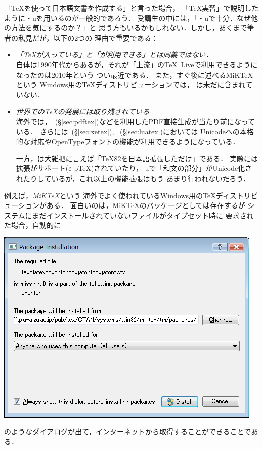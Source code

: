 \documentclass[b5paper]{bxjsarticle} %
\begin{document}
「\TeX を使って日本語文書を作成する」と言った場合，
「\TeX 実習」で説明したように\pTeX ・u\pTeX を用いるのが一般的であろう．
受講生の中には，「\pTeX ・u\pTeX で十分．なぜ他の方法を気にするのか？」と
思う方もいるかもしれない．しかし，あくまで筆者の私見だが，以下の2つの
理由で重要である：
\begin{itemize}
 \item \emph{「\TeX が入っている」と「\pTeX が利用できる」とは同義ではない．}\\
\pTeX 自体は1990年代からあるが，それが「上流」の\TeX~Liveで利用できるようになったのは2010年という
つい最近である．
また，すぐ後に述べるMiK\TeX という
Windows用の\TeX ディストリビューションでは，
\pTeX は未だに含まれていない．
 \item \emph{世界での\TeX の発展に\pTeX は取り残されている}\\
海外では，\pdfTeX~(\S\ref{sec:pdftex})などを利用したPDF直接生成が当たり前になっている．
さらには\XeTeX~(\S\ref{sec:xetex}), \LuaTeX~(\S\ref{sec:luatex})においては
Unicodeへの本格的な対応やOpenTypeフォントの機能が利用できるようになっている．

一方，\pTeX は大雑把に言えば「\TeX82を日本語拡張しただけ」である．
実際には\eTeX 拡張がサポート($\varepsilon$-p\TeX)されていたり，
u\pTeX で「和文の部分」がUnicode化されたりしているが，これ以上の機能拡張はもう
あまり行われないだろう．
\end{itemize}


例えば，\href{http://miktex.org/}{\emph{MiK\TeX}}\>という
海外でよく使われているWindows用の\TeX ディストリビューションがある．
面白いのは，MiK\TeX のパッケージとしては存在するが
システムにまだインストールされていないファイルがタイプセット時に
要求された場合，自動的に
\begin{center}
\includegraphics[scale=0.5]{mik-inst.png}
\end{center}
のようなダイアログが出て，インターネットから取得することができることである．
\end{document}
